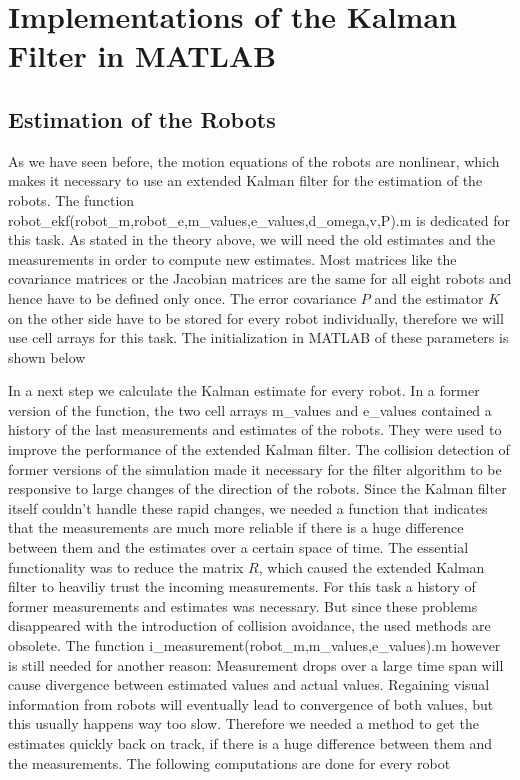 
\chapter{Implementations of the Kalman Filter in MATLAB}

\section{Estimation of the Robots}

As we have seen before, the motion equations of the robots are nonlinear, which makes it necessary to use an extended Kalman filter for the estimation of the robots. The function {\selectfont robot\_ekf(robot\_m,robot\_e,m\_values,e\_values,d\_omega,v,P).m} is dedicated for this task. As stated in the theory above, we will need the old estimates and the measurements in order to compute new estimates. Most matrices like the covariance matrices or the Jacobian matrices are the same for all eight robots and hence have to be defined only once. The error covariance \(P\) and the estimator \(K\) on the other side have to be stored for every robot individually, therefore we will use cell arrays for this task. The initialization in MATLAB of these parameters is shown below


\parskip 20pt

In a next step we calculate the Kalman estimate for every robot. In a former version of the function, the two cell arrays {\selectfont m\_values} and {\selectfont e\_values} contained a history of the last measurements and estimates of the robots. They were used to improve the performance of the extended Kalman filter. The collision detection of former versions of the simulation made it necessary for the filter algorithm to be responsive to large changes of the direction of the robots. Since the Kalman filter itself couldn't handle these rapid changes, we needed a function that indicates that the measurements are much more reliable if there is a huge difference between them and the estimates over a certain space of time. The essential functionality was  to reduce the matrix \(R\), which caused the extended Kalman filter to heaviliy trust the incoming measurements. For this task a history of former measurements and estimates was necessary. But since these problems disappeared with the introduction of collision avoidance, the used methods are obsolete. The function {\selectfont i\_measurement(robot\_m,m\_values,e\_values).m} however is still needed for another reason: Measurement drops over a large time span will cause divergence between estimated values and actual values. Regaining visual information from robots will eventually lead to convergence of both values, but this usually happens way too slow. Therefore we needed a method to get the estimates quickly back on track, if there is a huge difference between them and the measurements. The following computations are done for every robot

